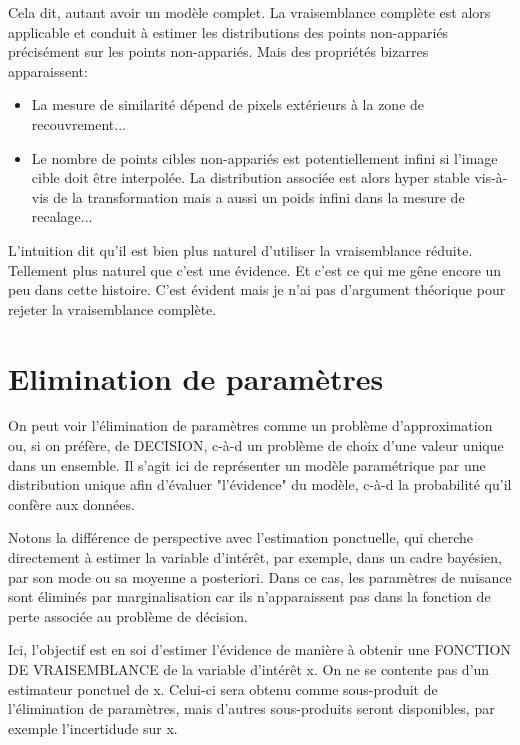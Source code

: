 \documentclass{article}
\begin{document}
Cela dit, autant avoir un mod\`ele complet. La vraisemblance compl\`ete est alors applicable et conduit \`a estimer les distributions des points non-appari\'es pr\'ecis\'ement sur les points non-appari\'es. Mais des propri\'et\'es bizarres apparaissent: 

\begin{itemize}
\item La mesure de similarit\'e d\'epend de pixels ext\'erieurs \`a la zone de   recouvrement... 
\item Le nombre de points cibles non-appari\'es est potentiellement infini si l'image cible doit \^etre interpol\'ee. La distribution associ\'ee est alors hyper stable vis-\`a-vis de la transformation mais a aussi un poids infini dans la mesure de recalage... 
\end{itemize}

L'intuition dit qu'il est bien plus naturel d'utiliser la vraisemblance r\'eduite. Tellement plus naturel que c'est une \'evidence. Et c'est ce qui me g\^ene encore un peu dans cette histoire. C'est \'evident mais je n'ai pas d'argument th\'eorique pour rejeter la vraisemblance compl\`ete. 


\section{Elimination de param\`etres}

On peut voir l'\'elimination de param\`etres comme un probl\`eme d'approximation ou, si on pr\'ef\`ere, de DECISION, c-\`a-d un probl\`eme de choix d'une valeur unique dans un ensemble. Il s'agit ici de repr\'esenter un mod\`ele param\'etrique par une distribution unique afin d'\'evaluer "l'\'evidence" du mod\`ele, c-\`a-d la probabilit\'e qu'il conf\`ere aux donn\'ees. 

Notons la diff\'erence de perspective avec l'estimation ponctuelle, qui cherche directement \`a estimer la variable d'int\'er\^et, par exemple, dans un cadre bay\'esien, par son mode ou sa moyenne a posteriori. Dans ce cas, les param\`etres de nuisance sont \'elimin\'es par marginalisation car ils n'apparaissent pas dans la fonction de perte associ\'ee au probl\`eme de d\'ecision. 

Ici, l'objectif est en soi d'estimer l'\'evidence de mani\`ere \`a obtenir une FONCTION DE VRAISEMBLANCE de la variable d'int\'er\^et x. On ne se contente pas d'un estimateur ponctuel de x. Celui-ci sera obtenu comme sous-produit de l'\'elimination de param\`etres, mais d'autres sous-produits seront disponibles, par exemple l'incertidude sur x. 
\end{document}
